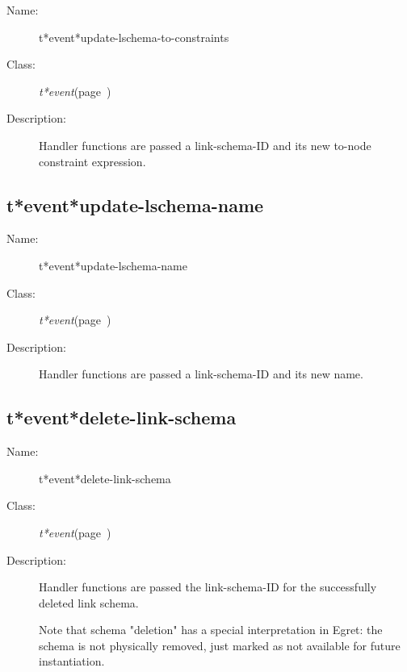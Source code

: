 \begin{description}
\item [Name:]  t*event*update-lschema-to-constraints

\item [Class:] {\sl t*event}\hfill(page~\pageref{t*event})

\item [Description:]

Handler functions are passed a link-schema-ID and
its new to-node constraint expression.


\end{description}
\horizontalline

\subsection{t*event*update-lschema-name}
\label{t*event*update-lschema-name}

\begin{description}
\item [Name:]  t*event*update-lschema-name

\item [Class:] {\sl t*event}\hfill(page~\pageref{t*event})

\item [Description:]

Handler functions are passed a link-schema-ID and
its new name.


\end{description}
\horizontalline

\subsection{t*event*delete-link-schema}
\label{t*event*delete-link-schema}

\begin{description}
\item [Name:]  t*event*delete-link-schema

\item [Class:] {\sl t*event}\hfill(page~\pageref{t*event})

\item [Description:]

Handler functions are passed the link-schema-ID for
the successfully deleted link schema.

Note that schema "deletion" has a special interpretation
in Egret: the schema is not physically removed, just
marked as not available for future instantiation.


\end{description}
\horizontalline

